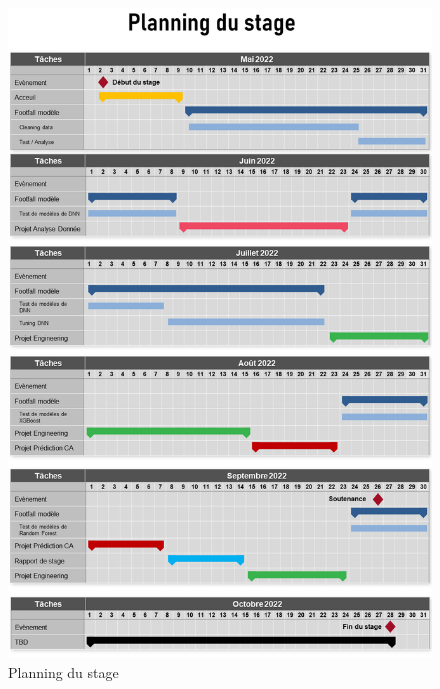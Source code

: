 \documentclass{themeensg}
\begin{document}
\begin{appendices} 
\label{beginappendices}
\label{planning_gannt}

\begin{figure}[H]
  \centering
  \includegraphics[width=13cm]{images/graphs/gannt.png}
  \caption{Planning du stage}
\end{figure}

\label{stat_dnn}


\end{appendices}
\end{document}
